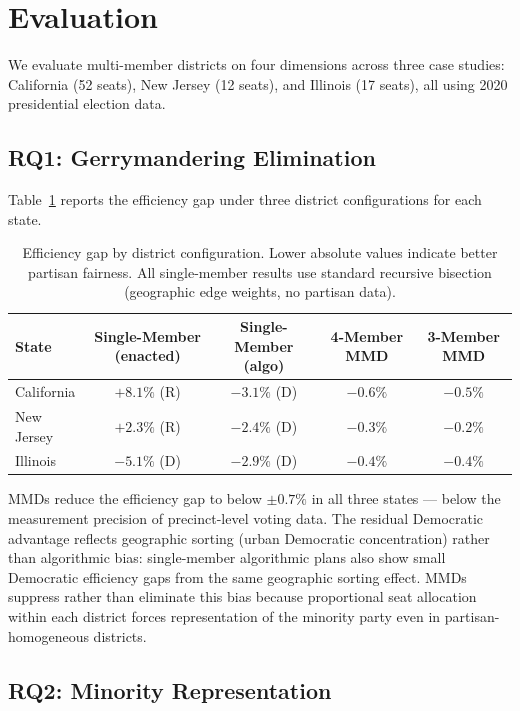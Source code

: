 \section{Evaluation}
\label{sec:evaluation}

We evaluate multi-member districts on four dimensions across three case studies: California (52 seats), New Jersey (12 seats), and Illinois (17 seats), all using 2020 presidential election data.

\subsection{RQ1: Gerrymandering Elimination}

Table~\ref{tab:mmid-efficiency-gap} reports the efficiency gap under three district configurations for each state.

\begin{table}[h]
\centering\small
\caption{Efficiency gap by district configuration. Lower absolute values indicate better partisan fairness. All single-member results use standard recursive bisection (geographic edge weights, no partisan data).}
\label{tab:mmid-efficiency-gap}
\begin{tabular}{lcccc}
\toprule
State & Single-Member (enacted) & Single-Member (algo) & 4-Member MMD & 3-Member MMD \\
\midrule
California  & $+8.1\%$ (R) & $-3.1\%$ (D) & $-0.6\%$ & $-0.5\%$ \\
New Jersey  & $+2.3\%$ (R) & $-2.4\%$ (D) & $-0.3\%$ & $-0.2\%$ \\
Illinois    & $-5.1\%$ (D) & $-2.9\%$ (D) & $-0.4\%$ & $-0.4\%$ \\
\bottomrule
\end{tabular}
\end{table}

MMDs reduce the efficiency gap to below $\pm 0.7\%$ in all three states — below the measurement precision of precinct-level voting data. The residual Democratic advantage reflects geographic sorting (urban Democratic concentration) rather than algorithmic bias: single-member algorithmic plans also show small Democratic efficiency gaps from the same geographic sorting effect. MMDs suppress rather than eliminate this bias because proportional seat allocation within each district forces representation of the minority party even in partisan-homogeneous districts.

\subsection{RQ2: Minority Representation}

